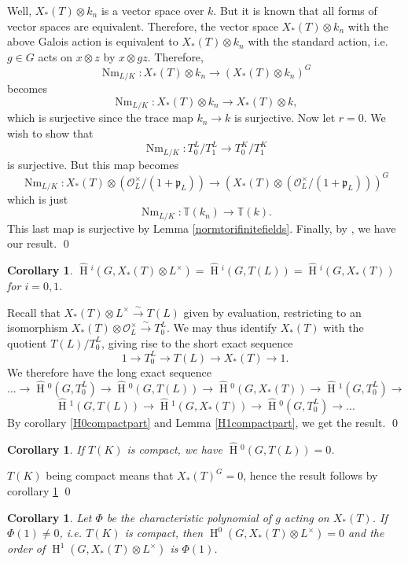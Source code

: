 \documentclass[11pt]{amsart}
\theoremstyle{plain}
\newtheorem{corollary}[theorem]{Corollary}
\newcommand{\HT}[1]{\hat{\HH}{}^{#1}}
\theoremstyle{definition}
\DeclareMathOperator{\HH}{H}
\DeclareMathOperator{\Nm}{Nm}
\begin{document}
Well, $X_*(T) \otimes k_n$ is a vector space over
$k$.  But it is known that all forms of vector spaces are
equivalent.  Therefore, the vector space $X_*(T) \otimes k_n$
with the above Galois action is equivalent to $X_*(T) \otimes k_n$
with the standard action, i.e. $g \in G$ acts on $x \otimes z$ by
$x \otimes gz$.  Therefore,
$$\Nm_{L/K} : X_*(T) \otimes k_n \rightarrow (X_*(T) \otimes k_n)^G$$
becomes
$$\Nm_{L/K} : X_*(T) \otimes k_n \rightarrow X_*(T) \otimes k,$$
which is surjective since the trace map $k_n \rightarrow k$
is surjective.  Now let $r = 0$.  We wish to show that
$$\Nm_{L/K} : T_0^L / T_1^L \rightarrow T_0^K / T_1^K$$
is surjective.  But this map becomes
$$\Nm_{L/K} : X_*(T) \otimes \left( \mathcal{O}_L^\times / (1 + \mathfrak{p}_L) \right) \rightarrow (X_*(T) \otimes \left( \mathcal{O}_L^\times / (1 + \mathfrak{p}_L) \right) )^G$$
which is just
$$\Nm_{L/K} : \mathbb{T}(k_n) \rightarrow \mathbb{T}(k).$$
This last map is surjective by Lemma \ref{normtorifinitefields}.
Finally, by \cite[Lemma 2, p. 81]{serre1}, we have our result.
\qed

\begin{corollary}\label{reductiontori}
$\HT{i}(G, X_*(T) \otimes L^\times) = \HT{i}(G, T(L)) = \HT{i}(G,X_*(T))$ for $i=0,1$.
\end{corollary}

\proof

Recall that $X_*(T) \otimes L^\times \xrightarrow{\sim} T(L)$ given by
evaluation, restricting to an isomorphism $X_*(T) \otimes \mathcal{O}_L^\times
\xrightarrow{\sim} T_0^L$.  We may thus identify $X_*(T)$ with the quotient
$T(L) / T_0^L$, giving rise to the short exact sequence
$$1 \rightarrow T_0^L \rightarrow T(L) \rightarrow X_*(T) \rightarrow 1.$$
We therefore have the long exact sequence
$$... \rightarrow \HT{0}(G, T_0^L) \rightarrow \HT{0}(G, T(L)) \rightarrow \HT{0}(G, X_*(T))
\rightarrow \HT{1}(G, T_0^L) \rightarrow $$ $$\HT{1}(G, T(L))
\rightarrow \HT{1}(G, X_*(T)) \rightarrow \HT{0}(G, T_0^L)
\rightarrow ...$$
By corollary \ref{H0compactpart} and Lemma \ref{H1compactpart}, we get the result.
\qed

\begin{corollary}
If $T(K)$ is compact, we have $\HT{0}(G, T(L)) = 0$.
\end{corollary}

\proof
$T(K)$ being compact means that $X_*(T)^G = 0$, hence the result follows by corollary \ref{reductiontori}
\qed

\begin{corollary}
  Let $\Phi$ be the characteristic polynomial of $g$ acting on $X_*(T)$. If
  $\Phi(1)\neq 0$, i.e. $T(K)$ is compact, then $\HH^0(G, X_*(T)\otimes
  L^{\times})=0$ and the order of $\HH^1(G, X_*(T)\otimes L^{\times})$ is
  $\Phi(1)$.
\end{corollary}
\end{document}
